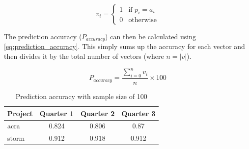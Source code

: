 

\begin{equation} 
\label{eq:vector_accuracy}
v_i = \left\{\begin{matrix}
1 & \text{if } p_i = a_i\\ 
0 & \text{otherwise}
\end{matrix}\right.
\end{equation}

The prediction accuracy ($P_{accuracy}$) can then be calculated using \ref{eq:prediction_accuracy}. This simply sums up the accuracy for each vector and then divides it by the total number of vectors (where $n = |v|$).

\begin{equation}
\label{eq:prediction_accuracy}
P_{accuracy} = \frac{\sum_{i=0}^{n}v_i}{n} \times 100
\end{equation}

\begin{table}
\begin{center}

    \begin{tabular}{|l|c|c|c|}
        \hline
        Project & Quarter 1 & Quarter 2 & Quarter 3 \\ \hline
        acra & 0.824 & 0.806 & 0.87   \\ \hline
        storm & 0.912 & 0.918 & 0.912 \\ \hline
    \end{tabular}
    \caption{Prediction accuracy with sample size of 100}
    \label{tab:test_signature_change_freq_100}
\end{center}

\end{table}

